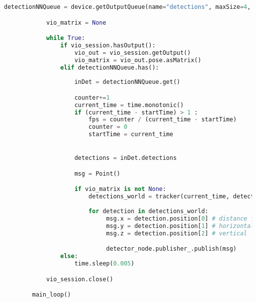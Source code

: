 \begin{lstlisting}[language=python,frame=single]
            detectionNNQueue = device.getOutputQueue(name="detections", maxSize=4, blocking=False)

            vio_matrix = None

            while True:
                if vio_session.hasOutput():
                    vio_out = vio_session.getOutput()
                    vio_matrix = vio_out.pose.asMatrix()
                elif detectionNNQueue.has():
                    
                    inDet = detectionNNQueue.get()

                    counter+=1
                    current_time = time.monotonic()
                    if (current_time - startTime) > 1 :
                        fps = counter / (current_time - startTime)
                        counter = 0
                        startTime = current_time


                    detections = inDet.detections

                    msg = Point()

                    if vio_matrix is not None:
                        detections_world = tracker(current_time, detections, vio_matrix)
                        
                        for detection in detections_world:
                             msg.x = detection.position[0] # distance from camera
                             msg.y = detection.position[1] # horizontal
                             msg.z = detection.position[2] # vertical

                             detector_node.publisher_.publish(msg)                        
                else:
                    time.sleep(0.005)

            vio_session.close()

        main_loop()
        
\end{lstlisting}